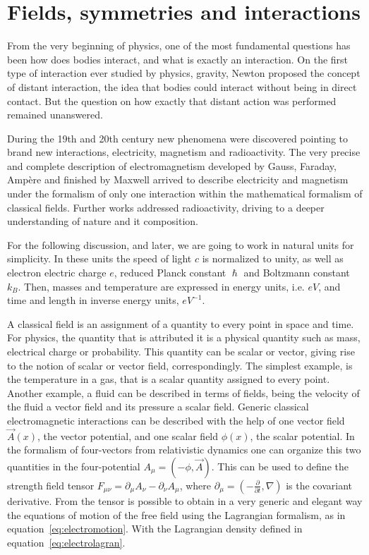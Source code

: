 \section{Fields, symmetries and interactions}
\label{sec:symm}

From the very beginning of physics, one of the most fundamental questions has been how does bodies interact, and what is exactly an interaction. On the first type of interaction ever studied by physics, gravity, Newton proposed the concept of distant interaction, the idea that bodies could interact without being in direct contact. But the question on how exactly that distant action was performed remained unanswered. 

During the 19th and 20th century new phenomena were discovered pointing to brand new interactions, electricity, magnetism and radioactivity. The very precise and complete description of electromagnetism developed by Gauss, Faraday, Amp\`{e}re and finished by Maxwell arrived to describe electricity and magnetism under the formalism of only one interaction within the mathematical formalism of classical fields. Further works addressed radioactivity, driving to a deeper understanding of nature and it composition.

For the following discussion, and later, we are going to work in natural units for simplicity. In these units the speed of light $c$ is normalized to unity, as well as electron electric charge $e$, reduced Planck constant $\hslash$ and Boltzmann constant $k_{B}$. Then, masses and temperature are expressed in energy units, i.e. $eV$, and time and length in inverse energy units, $eV^{-1}$.

A classical field is an assignment of a quantity to every point in space and time. For physics, the quantity that is attributed it is a physical quantity such as mass, electrical charge or probability. This quantity can be scalar or vector, giving rise to the notion of scalar or vector field, correspondingly. The simplest example, is the temperature in a gas, that is a scalar quantity assigned to every point. Another example, a fluid can be described in terms of fields, being the velocity of the fluid a vector field and its pressure a scalar field. Generic classical electromagnetic interactions can be described with the help of one vector field $\vec{A}(x)$, the vector potential, and one scalar field $\phi(x)$, the scalar potential. In the formalism of four-vectors from relativistic dynamics one can organize this two quantities in the four-potential $A_{\mu}=(-\phi,\vec{A})$. This can be used to define the strength field tensor $F_{\mu\nu}=\partial_{\mu}A_{\nu}-\partial_{\nu}A_{\mu}$, where $\partial_{\mu}=\left( -\frac{\partial}{\partial t},\nabla\right)$ is the covariant derivative. From the tensor is possible to obtain in a very generic and elegant way the equations of motion of the free field using the Lagrangian formalism, as in equation~\ref{eq:electromotion}. With the Lagrangian density defined in equation~\ref{eq:electrolagran}.

